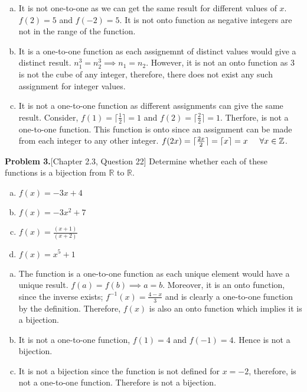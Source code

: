 \documentclass[addpoints]{exam}
\begin{document}
\begin{sloppypar}
\begin{questions}
\begin{solution}
\begin{enumerate}[(a)]
                \item It is not one-to-one as we can get the same result for different values of $x$. $f(2) = 5$ and $ f(-2) = 5 $. It is not onto function as negative integers are not in the range of the function.
                \item It is a one-to-one function as each assignemnt of distinct values would give a distinct result. $ n^3_1 = n^3_2 \implies n_1 = n_2 $. However, it is not an onto function as 3 is not the cube of any integer, therefore, there does not exist any such assignment for integer values.
                \item It is not a one-to-one function as different assignments can give the same result. Consider, $ f(1) = \lceil \frac{1}{2} \rceil = 1$ and $ f(2) = \lceil \frac{2}{2} \rceil = 1$. Therfore, is not a one-to-one function. This function is onto since an assignment can be made from each integer to any other integer. $ f(2x) = \lceil \frac{2x}{2} \rceil = \lceil x \rceil = x \hspace*{5mm} \forall x \in \mathbb{Z} $.  
            \end{enumerate}
        \end{solution}
    \question\textbf{Problem 3.}[Chapter 2.3, Question 22]
    Determine whether each of these functions is a bijection from $\mathbb{R}$ to $\mathbb{R}$.
        \begin{enumerate}[(a)]
            \item $f(x) = -3x + 4$
            \item $f(x) = -3x^2 + 7$
            \item $f(x) = \frac{(x+1)}{(x+2)} $
            \item $f(x) = x^5 + 1 $
    \end{enumerate}
        \begin{solution}
            \begin{enumerate}[(a)]
                \item The function is a one-to-one function as each unique element would have a unique result. $ f(a) = f(b) \implies a = b $. Moreover, it is an onto function, since the inverse exists; $ f^{-1}(x) = \frac{4-x}{3} $ and is clearly a one-to-one function by the definition. Therefore, $ f(x) $ is also an onto function which implies it is a bijection.
                \item It is not a one-to-one function, $ f(1) = 4 $ and $ f(-1) = 4 $. Hence is not a bijection.
                \item It is not a bijection since the function is not defined for $ x = -2 $, therefore, is not a one-to-one function. Therefore is not a bijection. 
                

\end{enumerate}
\end{solution}
\end{questions}
\end{sloppypar}
\end{document}
